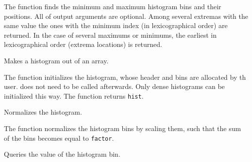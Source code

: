 The function finds the minimum and
maximum histogram bins and their positions. All of output arguments are
optional. Among several extremas with the same value the ones with the
minimum index (in lexicographical order) are returned. In the case of several maximums
or minimums, the earliest in lexicographical order (extrema locations)
is returned.

\ifC %
Makes a histogram out of an array.


\begin{description}
\end{description}

The function initializes the histogram, whose header and bins are allocated by th user.  does not need to be called afterwards. Only dense histograms can be initialized this way. The function returns \texttt{hist}.
\fi %

Normalizes the histogram.


\begin{description}
\end{description}

The function normalizes the histogram bins by scaling them, such that the sum of the bins becomes equal to \texttt{factor}.

\ifC
{}
Queries the value of the histogram bin.


